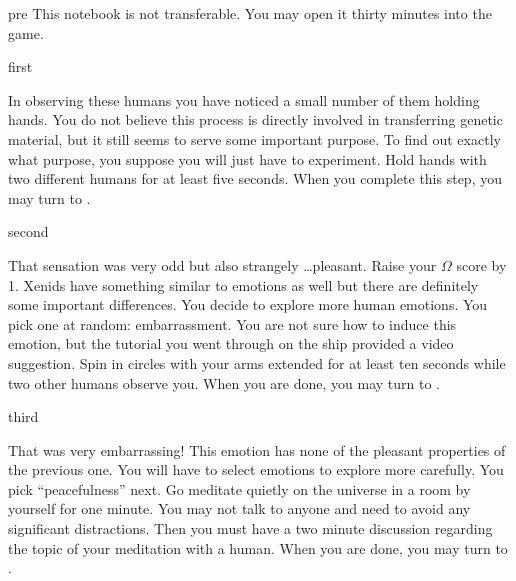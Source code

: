 \documentclass[notebook]{guildcamp1}
\begin{document}
\startnotebook{\nPlayWithDad{}}

\begin{page}{pre}
This notebook is not transferable. You may open it thirty minutes into the game.
\end{page}

\begin{page}{first}

In observing these humans you have noticed a small number of them holding hands. You do not believe this process is directly involved in transferring genetic material, but it still seems to serve some important purpose. To find out exactly what purpose, you suppose you will just have to experiment. Hold hands with two different humans for at least five seconds. When you complete this step, you may turn to .

\end{page}

\begin{page}{second}

That sensation was very odd but also strangely \ldots pleasant. Raise your $\Omega$ score by 1. Xenids have something similar to emotions as well but there are definitely some important differences. You decide to explore more human emotions. You pick one at random: embarrassment. You are not sure how to induce this emotion, but the tutorial you went through on the ship provided a video suggestion. Spin in circles with your arms extended for at least ten seconds while two other humans observe you. When you are done, you may turn to .

\end{page}

\begin{page}{third}

That was very embarrassing! This emotion has none of the pleasant properties of the previous one. You will have to select emotions to explore more carefully. You pick ``peacefulness'' next. Go meditate quietly on the universe in a room by yourself for one minute. You may not talk to anyone and need to avoid any significant distractions. Then you must have a two minute discussion regarding the topic of your meditation with a human. When you are done, you may turn to .

\end{page}
\end{document}
